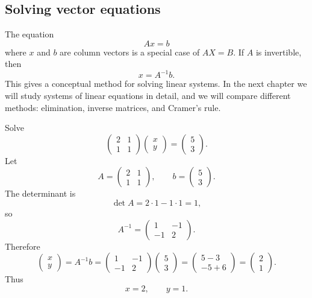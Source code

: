 \subsection{Solving vector equations}

The equation
\[
Ax=b
\]
where \(x\) and \(b\) are column vectors is a special case of \(AX=B\). If \(A\) is invertible, then
\[
x=A^{-1}b.
\]
This gives a conceptual method for solving linear systems. In the next chapter we will study systems of linear equations in detail, and we will compare different methods: elimination, inverse matrices, and Cramer's rule.

\begin{examplebox}
Solve
\[
\begin{pmatrix}2&1\\1&1\end{pmatrix}
\begin{pmatrix}x\\y\end{pmatrix}
=
\begin{pmatrix}5\\3\end{pmatrix}.
\]
Let
\[
A=\begin{pmatrix}2&1\\1&1\end{pmatrix},
\qquad
b=\begin{pmatrix}5\\3\end{pmatrix}.
\]
The determinant is
\[
\det A=2\cdot1-1\cdot1=1,
\]
so
\[
A^{-1}=\begin{pmatrix}1&-1\\-1&2\end{pmatrix}.
\]
Therefore
\[
\begin{pmatrix}x\\y\end{pmatrix}
=A^{-1}b
=\begin{pmatrix}1&-1\\-1&2\end{pmatrix}
\begin{pmatrix}5\\3\end{pmatrix}
=\begin{pmatrix}5-3\\-5+6\end{pmatrix}
=\begin{pmatrix}2\\1\end{pmatrix}.
\]
Thus
\[
x=2,
\qquad
 y=1.
\]
\end{examplebox}

